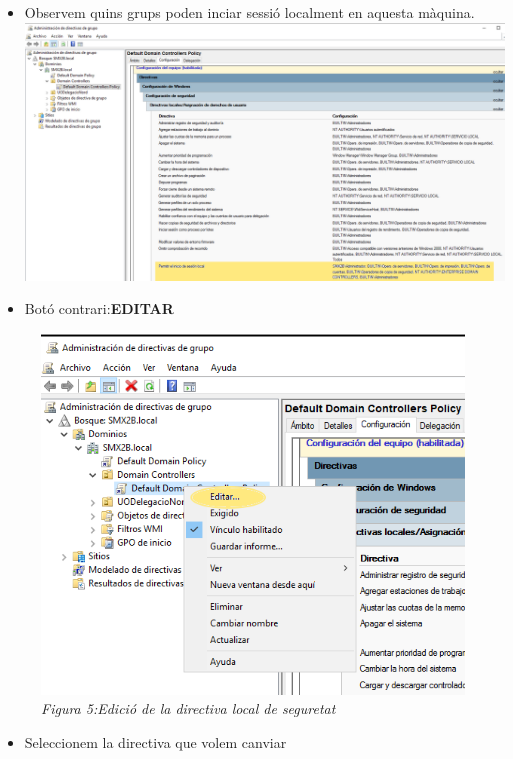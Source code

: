 \documentclass[
  a4paper,
]{article}
\providecommand{\tightlist}{%
  \setlength{\itemsep}{0pt}\setlength{\parskip}{0pt}}
\begin{document}
\begin{itemize}
\item
  Observem quins grups poden inciar sessió localment en aquesta màquina.
  \includegraphics{png/mostrarDirectiva1.png}
\item
  Botó contrari:\textbf{EDITAR}
\end{itemize}

\begin{figure}
\centering
\includegraphics{png/EditarDirectiva1.png}
\caption{\emph{Figura 5:Edició de la directiva local de seguretat}}
\end{figure}

\begin{itemize}
\tightlist
\item
  Seleccionem la directiva que volem canviar
\end{itemize}
\end{document}
